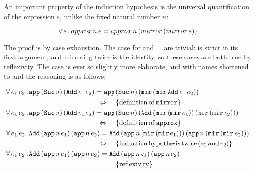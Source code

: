 An important property of the induction hypothesis is the universal
quantification of the expression $e$, unlike the fixed natural number
$n$:

\begin{equation*}
\forall \, e \, . \,  approx \, n \, e = approx \, n \, (mirror \, (mirror \, e))
\end{equation*}

The proof is by case exhaustion. The case for  and $\bot$
are trivial:  is strict in its first argument, and
mirroring  twice is the identity, so these cases are both
true by reflexivity. The  case is ever so slightly more
elaborate, and with names shortened to  and  the
reasoning is as follows:

\newcommand{\Adds}[2]{\hs{Add} \, #1 e_1 #2 \, #1 e_2 #2}
\newcommand{\Approxn}[0]{\hs{app} \, n \,}
\newcommand{\ApproxSucn}[0]{\hs{app} \, (\hs{Suc} \, n) \,}
\newcommand{\mirmir}[0]{\hs{mir} \, (\hs{mir} \, }
\begin{align*}
\faa{e_1}{e_2}&  \ApproxSucn (\Adds{}{})  = \ApproxSucn (\mirmir \Adds{}{} ))                                                                   \\
                                                                                 \desclra{\defof{\hs{mirror}}}                                   \\
\faa{e_1}{e_2}&  \ApproxSucn (\Adds{}{})  = \ApproxSucn (\Adds{(\mirmir}{))})                                                                    \\
                                                                                \desclra{\defof{\hs{approx}}}                                    \\
\faa{e_1}{e_2}&  \Adds{(\Approxn}{)}      = \Adds{(\Approxn(\mirmir}{)))}                                                                        \\
                                                                                \desclra{induction \, hypothesis \, twice \, (e_1 \, and \, e_2)} \\
\faa{e_1}{e_2}&  \Adds{(\Approxn}{)}      = \Adds{(\Approxn}{)}                                                                                  \\
                                                                                \desca{reflexivity}                                              \\
\end{align*}

